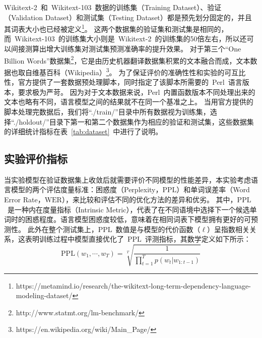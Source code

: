 Wikitext-2~和~Wikitext-103~数据的训练集（Training Dataset）、验证（Validation Dataset）和测试集（Testing Dataset）都是预先划分固定的，并且其词表大小也已经被定义\footnote{https://metamind.io/research/the-wikitext-long-term-dependency-language-modeling-dataset/}。
这两个数据集的验证集和测试集是相同的，而~Wikitext-103~的训练集大小则是~Wikitext-2~的训练集的50倍左右，所以还可以间接测算出增大训练集对测试集预测准确率的提升效果。
对于第三个``One Billion Words''数据集\footnote{http://www.statmt.org/lm-benchmark/}，它是由历史机器翻译数据集积累的文本融合而成，文本数据也取自维基百科（Wikipedia）\footnote{https://en.wikipedia.org/wiki/Main\_Page/}。
为了保证评价的准确性性和实验的可互比性，官方提供了一套数据预处理脚本，同时指定了该脚本所需要的~Perl~语言版本，要求极为严苛。
因为对于文本数据来说，Perl~内置函数版本不同处理出来的文本也略有不同，语言模型之间的结果就不在同一个基准之上。
当用官方提供的脚本处理完数据后，我们将``./train/''目录中所有数据视为训练集，选择``./holdout/''目录下第一和第二个数据集作为相应的验证和测试集，这些数据集的详细统计指标在表~\ref{tab:dataset}~中进行了说明。

\subsection{实验评价指标}
当实验模型在验证数据集上收敛后就需要评价不同模型的性能差异，本实验考虑语言模型的两个评估度量标准：困惑度（Perplexity，$ \mathrm{PPL} $）和单词误差率（Word Error Rate，$\mathrm{WER} $），来比较和评估不同的优化方法的差异和优劣。
其中，$\mathrm{PPL}$~是一种内在度量指标（Intrinsic Metric），代表了在不同语境中选择下一个候选单词时的困惑程度。语言模型困惑度较低，意味着在相同词表下模型拥有更好的可预测性。
此外在整个测试集上，$\mathrm{PPL}$~数值是与模型的代价函数（$\ell$）呈指数相关关系，这表明训练过程中模型直接优化了~$ \mathrm{PPL} $~评测指标，其数学定义如下所示：
\begin{equation}\label{equ:ppl}
   \mathrm{PPL}(w_1,\cdots,w_T)=\sqrt[T]{\frac{1}{\prod_{t=1}^T p(w_t|w_{1:t-1})}}
\end{equation}


